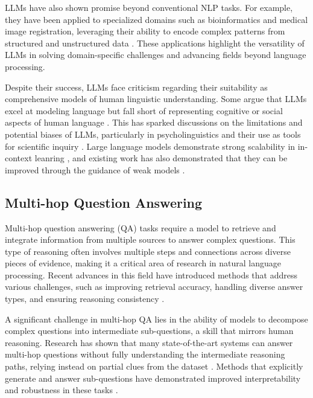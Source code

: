 LLMs have also shown promise beyond conventional NLP tasks. For example, they have been applied to specialized domains such as bioinformatics and medical image registration, leveraging their ability to encode complex patterns from structured and unstructured data \cite{liu2024bioinformatics,ma2024llama}. These applications highlight the versatility of LLMs in solving domain-specific challenges and advancing fields beyond language processing.

Despite their success, LLMs face criticism regarding their suitability as comprehensive models of human linguistic understanding. Some argue that LLMs excel at modeling language but fall short of representing cognitive or social aspects of human language \cite{veres2022precis,grindrod2024modelling}. This has sparked discussions on the limitations and potential biases of LLMs, particularly in psycholinguistics and their use as tools for scientific inquiry \cite{houghton2023psycholinguistics}.
Large language models demonstrate strong scalability in in-context leanring \cite{zhou2024visual}, and existing work has also demonstrated that they can be improved through the guidance of weak models \cite{zhou2025weak}.

\subsection{Multi-hop Question Answering}

Multi-hop question answering (QA) tasks require a model to retrieve and integrate information from multiple sources to answer complex questions. This type of reasoning often involves multiple steps and connections across diverse pieces of evidence, making it a critical area of research in natural language processing. Recent advances in this field have introduced methods that address various challenges, such as improving retrieval accuracy, handling diverse answer types, and ensuring reasoning consistency \cite{balepur2024reverse,amouyal2022qampari}.

A significant challenge in multi-hop QA lies in the ability of models to decompose complex questions into intermediate sub-questions, a skill that mirrors human reasoning. Research has shown that many state-of-the-art systems can answer multi-hop questions without fully understanding the intermediate reasoning paths, relying instead on partial clues from the dataset \cite{tang2020subquestions}. Methods that explicitly generate and answer sub-questions have demonstrated improved interpretability and robustness in these tasks \cite{wang2022covqa}.

